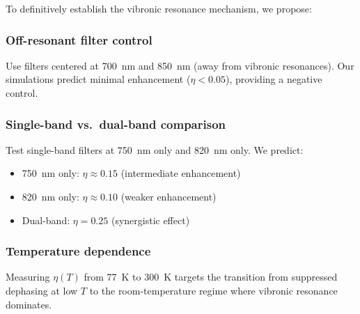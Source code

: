 \documentclass[11pt,a4paper]{article}
\begin{document}
To definitively establish the vibronic resonance mechanism, we propose:

\subsubsection*{Off-resonant filter control}

Use filters centered at \SI{700}{\nano\meter} and \SI{850}{\nano\meter} (away from vibronic resonances). Our simulations predict minimal enhancement ($\eta < 0.05$), providing a negative control.

\subsubsection*{Single-band vs.\ dual-band comparison}

Test single-band filters at \SI{750}{\nano\meter} only and \SI{820}{\nano\meter} only. We predict:
\begin{itemize}
    \item 750~nm only: $\eta \approx 0.15$ (intermediate enhancement)
    \item 820~nm only: $\eta \approx 0.10$ (weaker enhancement)
    \item Dual-band: $\eta = 0.25$ (synergistic effect)
\end{itemize}

\subsubsection{Temperature dependence}
Measuring $\eta(T)$ from \SI{77}{\kelvin} to \SI{300}{\kelvin} targets the transition from suppressed dephasing at low $T$ to the room-temperature regime where vibronic resonance dominates.




\end{document}
